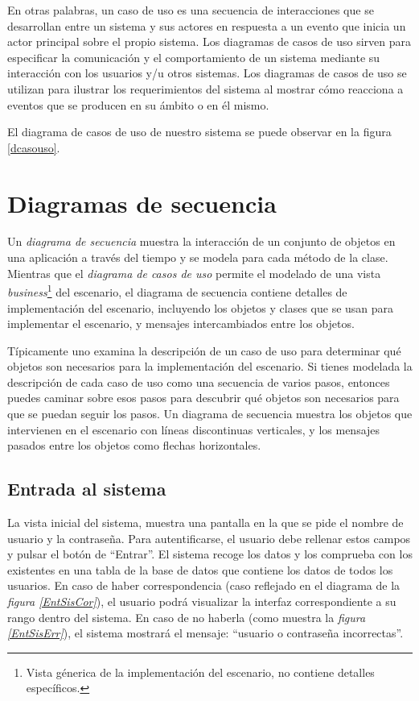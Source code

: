 \documentclass[11pt,a4paper,spanish,twoside]{book}
\begin{document}
En otras palabras, un caso de uso es una secuencia de interacciones que se
desarrollan entre un sistema y sus actores en respuesta a un evento que
inicia un actor principal sobre el propio sistema. Los diagramas de casos de
uso sirven para especificar la comunicación y el comportamiento de un sistema
mediante su interacción con los usuarios y/u otros sistemas. Los diagramas de
casos de uso se utilizan para ilustrar los requerimientos del sistema al
mostrar cómo reacciona a eventos que se producen en su ámbito o en él mismo.

El diagrama de casos de uso de nuestro sistema se puede observar en la figura
\ref{dcasouso}.


\section{Diagramas de secuencia}
Un \emph{diagrama de secuencia} muestra la interacción de un conjunto de
objetos en una aplicación a través del tiempo y se modela para cada método de
la clase. Mientras que el \emph{diagrama de casos de uso} permite el modelado
de una vista \emph{business}\footnote{Vista génerica de la implementación del
escenario, no contiene detalles específicos.} del escenario, el diagrama de 
secuencia contiene detalles de implementación del escenario, incluyendo los 
objetos y clases que se usan para implementar el escenario, y mensajes 
intercambiados entre los objetos.

Típicamente uno examina la descripción de un caso de uso para determinar qué
objetos son necesarios para la implementación del escenario. Si tienes
modelada la descripción de cada caso de uso como una secuencia de varios
pasos, entonces puedes caminar sobre esos pasos para descubrir qué objetos
son necesarios para que se puedan seguir los pasos. Un diagrama de secuencia
muestra los objetos que intervienen en el escenario con líneas discontinuas
verticales, y los mensajes pasados entre los objetos como flechas horizontales.

\subsection{Entrada al sistema}
La vista inicial del sistema, muestra una pantalla en la que se pide el nombre
de usuario y la contraseña. Para autentificarse, el usuario debe rellenar
estos campos y pulsar el botón de ``Entrar''. El sistema recoge los datos y los
comprueba con los existentes en una tabla de la base de datos que contiene los
datos de todos los usuarios. En caso de haber correspondencia (caso reflejado
en el diagrama de la \emph{figura \ref{EntSisCor}}), el usuario podrá
visualizar la interfaz correspondiente a su rango dentro del sistema. En caso
de no haberla (como muestra la \emph{figura \ref{EntSisErr}}), el sistema 
mostrará el mensaje: ``usuario o contraseña incorrectas''.
\end{document}
